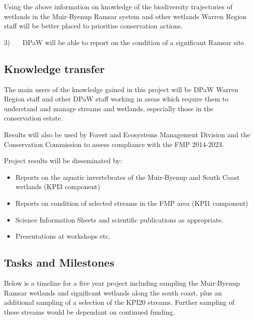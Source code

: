 \documentclass[version=last,
    paper=a4, %
    10pt, %
    usenames,
    dvipsnames,
    oneside, %
    headings=openany, %
    DIV=15 %
]{scrbook}
\begin{document}
Using the above information on knowledge of the biodiversity
trajectories of wetlands in the Muir-Byenup Ramsar system and other
wetlands Warren Region staff will be better placed to prioritise
conservation actions.

3)~~~ DPaW will be able to report on the condition of a significant
Ramsar site.



\subsection*{Knowledge transfer}
The main users of the knowledge gained in this project will be DPaW
Warren Region staff and other DPaW staff working in areas which require
them to understand and manage streams and wetlands, especially those in
the conservation estate.

Results will also be used by Forest and Ecosystems Management Division
and the Conservation Commission to assess compliance with the FMP
2014-2023.

Project results will be disseminated by:

\begin{itemize}
\itemsep1pt\parskip0pt
\item
  Reports on the aquatic invertebrates of the Muir-Byenup and South
  Coast wetlands (KPI3 component)
\item
  Reports on condition of selected streams in the FMP area (KPI1
  component)
\item
  Science Information Sheets and scientific publications as appropriate.
\item
  Presentations at workshops etc.
\end{itemize}



\subsection*{Tasks and Milestones}
Below is a timeline for a five year project including sampling the
Muir-Byenup Ramsar wetlands and significant wetlands along the south
coast, plus an additional sampling of a selection of the KPI20 streams.
Further sampling of these streams would be dependant on continued
funding.
\end{document}
